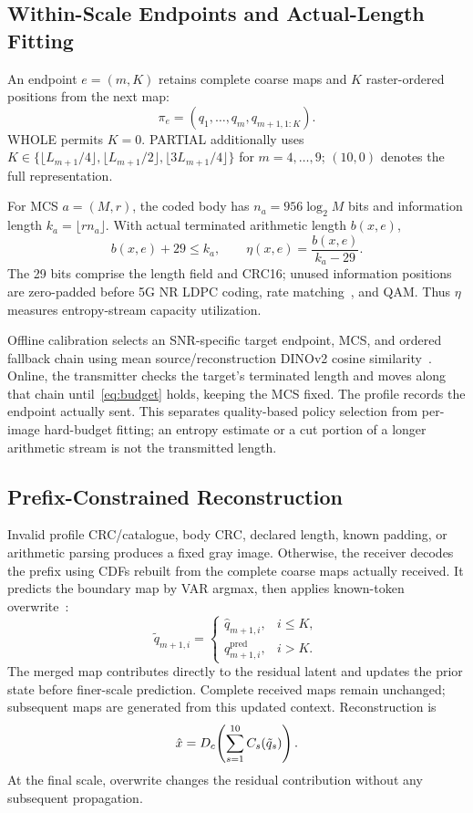 \subsection{Within-Scale Endpoints and Actual-Length Fitting}
An endpoint $e=(m,K)$ retains complete coarse maps and $K$ raster-ordered positions from the next map:
\begin{equation}
 \pi_e=(q_1,\ldots,q_m,q_{m+1,1:K}).
 \label{eq:prefix}
\end{equation}
WHOLE permits $K=0$. PARTIAL additionally uses
$K\in\{\lfloor L_{m+1}/4\rfloor,\lfloor L_{m+1}/2\rfloor,\lfloor3L_{m+1}/4\rfloor\}$ for $m=4,\ldots,9$; $(10,0)$ denotes the full representation.

For MCS $a=(M,r)$, the coded body has $n_a=956\log_2M$ bits and information length $k_a=\lfloor rn_a\rfloor$. With actual terminated arithmetic length $b(x,e)$,
\begin{equation}
 b(x,e)+29\leq k_a,\qquad \eta(x,e)=\frac{b(x,e)}{k_a-29}.
 \label{eq:budget}
\end{equation}
The 29 bits comprise the length field and CRC16; unused information positions are zero-padded before 5G NR LDPC coding, rate matching~\cite{nr}, and QAM. Thus $\eta$ measures entropy-stream capacity utilization.

Offline calibration selects an SNR-specific target endpoint, MCS, and ordered fallback chain using mean source/reconstruction DINOv2 cosine similarity~\cite{dinov2}. Online, the transmitter checks the target's terminated length and moves along that chain until~\eqref{eq:budget} holds, keeping the MCS fixed. The profile records the endpoint actually sent. This separates quality-based policy selection from per-image hard-budget fitting; an entropy estimate or a cut portion of a longer arithmetic stream is not the transmitted length.

\subsection{Prefix-Constrained Reconstruction}
Invalid profile CRC/catalogue, body CRC, declared length, known padding, or arithmetic parsing produces a fixed gray image. Otherwise, the receiver decodes the prefix using CDFs rebuilt from the complete coarse maps actually received. It predicts the boundary map by VAR argmax, then applies known-token overwrite~\cite{var}:
\begin{equation}
 \tilde q_{m+1,i}=\begin{cases}\hat q_{m+1,i},&i\leq K,\\q^{\mathrm{pred}}_{m+1,i},&i>K.\end{cases}
 \label{eq:overwrite}
\end{equation}
The merged map contributes directly to the residual latent and updates the prior state before finer-scale prediction. Complete received maps remain unchanged; subsequent maps are generated from this updated context. Reconstruction is
\begin{equation}
 \hat x=D_c\!\left(\sum_{s=1}^{10}C_s(\tilde q_s)\right).
 \label{eq:reconstruction}
\end{equation}
At the final scale, overwrite changes the residual contribution without any subsequent propagation.
